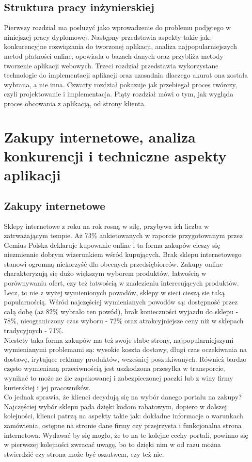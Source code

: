 \documentclass[12pt]{article}
\begin{document}
\begin{sloppypar}
{  \subsection{Struktura pracy inżynierskiej}
  {
    Pierwszy rozdział ma posłużyć jako wprowadzenie do problemu podjętego w niniejszej pracy dyplomowej.
    Następny przedstawia aspekty takie jak: konkurencyjne rozwiązania do tworzonej aplikacji,
    analiza najpopularniejszych metod płatności online, opowiada o bazach danych oraz przybliża
    metody tworzenie aplikacji webowych.
    Trzeci rozdział przedstawia wykorzystane technologie do implementacji aplikacji oraz uzasadnia dlaczego
    akurat ona została wybrana, a nie inna.
    Czwarty rozdział pokazuje jak przebiegał proces twórczy, czyli projektowanie i implementacja. 
    Piąty rozdział mówi o tym, jak wygląda proces obcowania z aplikacją, od strony klienta.
  }
}

\section{Zakupy internetowe, analiza konkurencji i techniczne aspekty aplikacji}
{
  \subsection{Zakupy internetowe}
  {
    Sklepy internetowe z roku na rok rosną w siłę, przybywa ich liczba w zatrważającym tempie. 
    Aż 73\% ankietowanych w raporcie przygotowanym przez Gemius Polska\cite{gemius-report} deklaruje kupowanie online i ta forma zakupów cieszy się niezmiennie dobrym 
    wizerunkiem wśród kupujących. Brak sklepu internetowego stanowi ogromną niekorzyść dla obecnych przedsiębiorców. 
    Zakupy online charakteryzują się dużo większym wyborem produktów, łatwością w porównywaniu ofert, czy też łatwością w znalezieniu interesujących produktów. 
    Lecz, to nie z wyżej wymienionych powodów, sklepy w sieci cieszą sie taką popularnością.
    Wśród najczęściej wymienianych powodów są: dostępność przez całą dobę (aż 82\% wybrało ten powód), brak konieczności wyjazdu do sklepu - 78\%, 
    nieograniczony czas wyboru - 72\% oraz atrakcyjniejsze ceny niż w sklepach tradycyjnych - 71\%.\\
    Niestety taka forma zakupów ma też swoje słabe strony, najpopularniejszymi
    wymienianymi problemami są: wysokie koszta dostawy, długi czas oczekiwania na dostawę, irytujące reklamy produktów, wcześniej poszukiwanych.
    Również bardzo często wymienianą przeciwnością jest uszkodzona przesyłka w transporcie, wynikać to może ze źle zapakowanej i zabezpieczonej paczki lub z winy 
    firmy kurierskiej i jej pracowników.\\
    Co jednak sprawia, że klienci decydują się na wybór danego portalu na zakupy?\\
    Najczęściej wybór sklepu pada dzięki kodom rabatowym, dopiero w dalszej kolejności, klienci patrzą na aspekty takie jak:
    dokładne informacje o warunkach zamówienia, ostępne na stronie dane firmy czy przejrzysta i funkcjonalna strona internetowa. 
    Wydawać by się mogło, że to na te kolejne cechy portali, powinno się w pierwszej kolejności
    zwracać uwagę, bo to dzięki nim w od razu można stwierdzić czy strona może być oszutwem, czy też nie.
    }
}
\end{sloppypar}
\end{document}
